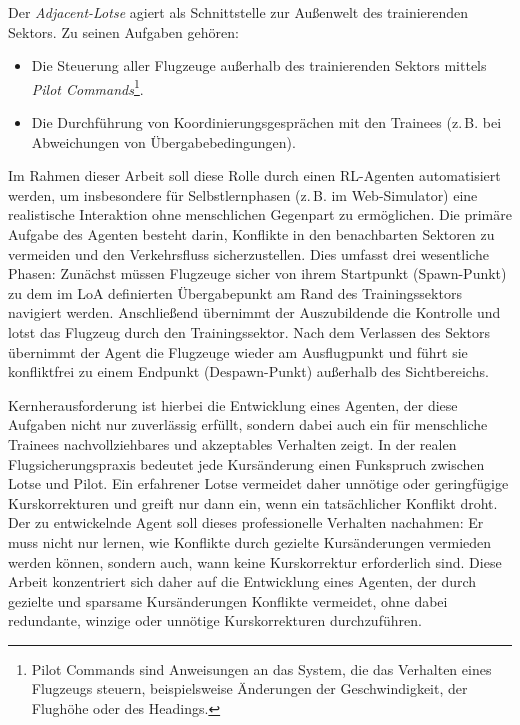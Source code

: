 Der \textit{Adjacent-Lotse} agiert als Schnittstelle zur Außenwelt des trainierenden Sektors.
Zu seinen Aufgaben gehören:
\begin{itemize}
    \item Die Steuerung aller Flugzeuge außerhalb des trainierenden Sektors mittels \textit{Pilot Commands}\footnote{Pilot Commands sind Anweisungen an das System, die das Verhalten eines Flugzeugs steuern, beispielsweise Änderungen der Geschwindigkeit, der Flughöhe oder des Headings.}.
    \item Die Durchführung von Koordinierungsgesprächen mit den Trainees (z.\,B. bei Abweichungen von Übergabebedingungen).
\end{itemize}

Im Rahmen dieser Arbeit soll diese Rolle durch einen \ac{RL}\hyp{}Agenten automatisiert werden, um insbesondere für Selbstlernphasen (z.\,B. im Web-Simulator) eine realistische Interaktion ohne menschlichen Gegenpart zu ermöglichen.
Die primäre Aufgabe des Agenten besteht darin, Konflikte in den benachbarten Sektoren zu vermeiden und den Verkehrsfluss sicherzustellen.
Dies umfasst drei wesentliche Phasen: Zunächst müssen Flugzeuge sicher von ihrem Startpunkt (Spawn\hyp{}Punkt) zu dem im \ac{LoA} definierten Übergabepunkt am Rand des Trainingssektors navigiert werden.
Anschließend übernimmt der Auszubildende die Kontrolle und lotst das Flugzeug durch den Trainingssektor.
Nach dem Verlassen des Sektors übernimmt der Agent die Flugzeuge wieder am Ausflugpunkt und führt sie konfliktfrei zu einem Endpunkt (Despawn\hyp{}Punkt) außerhalb des Sichtbereichs.
\medskip

Kernherausforderung ist hierbei die Entwicklung eines Agenten, der diese Aufgaben nicht nur zuverlässig erfüllt, sondern dabei auch ein für menschliche Trainees nachvollziehbares und akzeptables Verhalten zeigt.
In der realen Flugsicherungspraxis bedeutet jede Kursänderung einen Funkspruch zwischen Lotse und Pilot.
Ein erfahrener Lotse vermeidet daher unnötige oder geringfügige Kurskorrekturen und greift nur dann ein, wenn ein tatsächlicher Konflikt droht.
Der zu entwickelnde Agent soll dieses professionelle Verhalten nachahmen: Er muss nicht nur lernen, wie Konflikte durch gezielte Kursänderungen vermieden werden können, sondern auch, wann keine Kurskorrektur erforderlich sind.
Diese Arbeit konzentriert sich daher auf die Entwicklung eines Agenten, der durch gezielte und sparsame Kursänderungen Konflikte vermeidet, ohne dabei redundante, winzige oder unnötige Kurskorrekturen durchzuführen.
